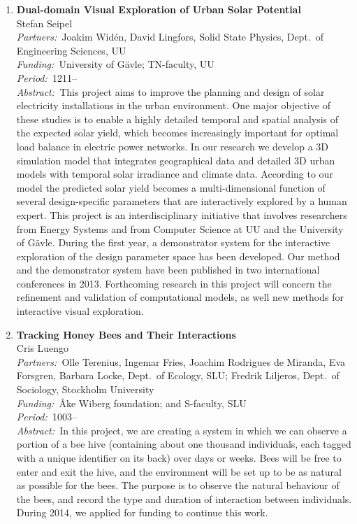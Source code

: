 \documentclass[10pt, a4paper]{article}
\newcommand{\period}{\emph{Period:~}}
\newcommand{\aabstract}[1]{\emph{Abstract:~}#1}
\newcommand{\ffunding}[1]{\emph{Funding:~}#1\\}
\newcommand{\ppartners}[1]{\emph{Partners:~}#1\\}
\newcommand{\pperiod}[1]{\emph{Period:~}#1\\}
\begin{document}
\begin{enumerate}

\item \textbf{Dual-domain Visual Exploration of Urban Solar Potential}\\
Stefan Seipel\\
\ppartners{Joakim Wid\'{e}n, David Lingfors, Solid State Physics, Dept.~of Engineering Sciences, UU}
\ffunding{University of G\"{a}vle; TN-faculty, UU}
\pperiod{1211--}%
\aabstract{This project aims to improve the planning and design of solar electricity installations in the urban environment. One major objective of these studies is to enable a highly detailed temporal and spatial analysis of the expected solar yield, which becomes increasingly important for optimal load balance in electric power networks. In our research we develop a 3D simulation model that integrates geographical data and detailed 3D urban models with temporal solar irradiance and climate data. According to our model the predicted solar yield becomes a multi-dimensional function of several design-specific parameters that are interactively explored by a human expert.  This project is an interdisciplinary initiative that involves researchers from Energy Systems and from Computer Science at UU and the University of G\"{a}vle. During the first year, a demonstrator system for the interactive exploration of the design parameter space has been developed. Our method and the demonstrator system have been published in two international conferences in 2013. Forthcoming research in this project will concern the refinement and validation of computational models, as well new methods for interactive visual exploration.}





\item 
\label{proj:honey_bees}
\textbf{Tracking Honey Bees and Their Interactions}\\
Cris Luengo\\
\ppartners{Olle Terenius, Ingemar Fries, Joachim Rodrigues de Miranda, Eva Forsgren, Barbara Locke, Dept.~of Ecology, SLU; Fredrik Liljeros, Dept.~of Sociology, Stockholm University}
\ffunding{{\AA}ke Wiberg foundation; and S-faculty, SLU}
\period{1003--}\\
\aabstract{In this project, we are creating a system in which we can observe a portion of a bee hive (containing about one thousand individuals, each tagged with a unique identifier on its back) over days or weeks. Bees will be free to enter and exit the hive, and the environment will be set up to be as natural as possible for the bees. The purpose is to observe the natural behaviour of the bees, and record the type and duration of interaction between individuals. During 2014, we applied for funding to continue this work.}


\end{enumerate}
\end{document}
